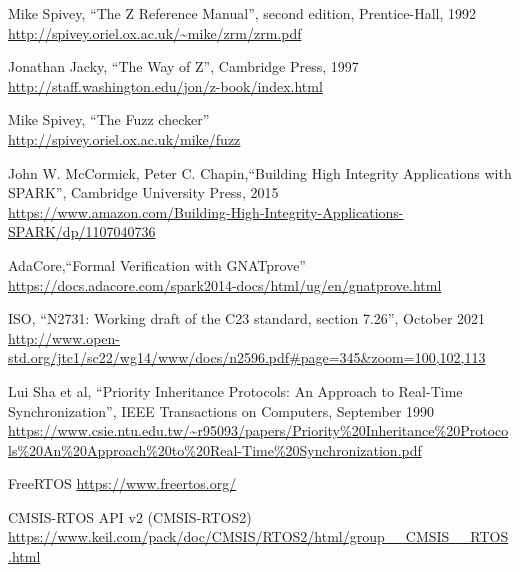 \documentclass{AUJarticle}
\begin{document}
%
%

\begin{thebibliography}{9}

Mike Spivey, ``The Z Reference Manual'', second edition, Prentice-Hall, 1992 \\
\url{http://spivey.oriel.ox.ac.uk/~mike/zrm/zrm.pdf}

Jonathan Jacky, ``The Way of Z'', Cambridge Press, 1997 \\
\url{http://staff.washington.edu/jon/z-book/index.html}

Mike Spivey, ``The Fuzz checker'' \\
\url{http://spivey.oriel.ox.ac.uk/mike/fuzz}

John W. McCormick, Peter C. Chapin,``Building High Integrity Applications with SPARK'', Cambridge University Press, 2015 \\
\url{https://www.amazon.com/Building-High-Integrity-Applications-SPARK/dp/1107040736}

AdaCore,``Formal Verification with GNATprove'' \\
\url{https://docs.adacore.com/spark2014-docs/html/ug/en/gnatprove.html}

ISO, ``N2731: Working draft of the C23 standard, section 7.26'', October 2021 \\
\url{http://www.open-std.org/jtc1/sc22/wg14/www/docs/n2596.pdf#page=345&zoom=100,102,113}

Lui Sha et al, ``Priority Inheritance Protocols: An Approach to Real-Time Synchronization'', IEEE Transactions on Computers, September 1990 \\
\url{https://www.csie.ntu.edu.tw/~r95093/papers/Priority%20Inheritance%20Protocols%20An%20Approach%20to%20Real-Time%20Synchronization.pdf}

FreeRTOS
\url{https://www.freertos.org/}

CMSIS-RTOS API v2 (CMSIS-RTOS2)
\url{https://www.keil.com/pack/doc/CMSIS/RTOS2/html/group__CMSIS__RTOS.html}

\end{thebibliography}
\end{document}
